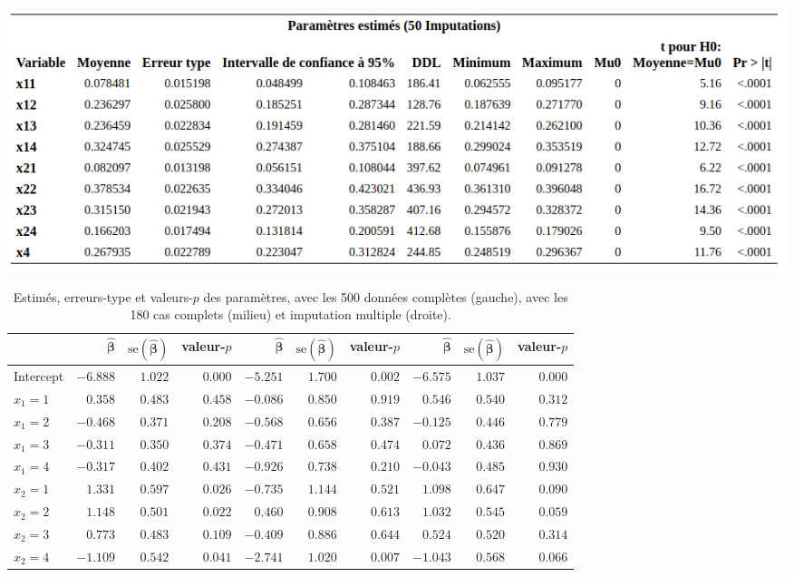 \documentclass[
  11pt,
  letterpaper,
]{book}
\theoremstyle{definition}
\theoremstyle{definition}
\theoremstyle{definition}
\theoremstyle{definition}
\theoremstyle{remark}
\begin{document}
\begin{center}\includegraphics[width=1\linewidth]{figures/06-manquantes-e5} \end{center}

\begin{table}

\caption{\label{tab:missing3r}Estimés, erreurs-type et valeurs-$p$ des paramètres,  avec les 500 données complètes (gauche), avec les 180 cas complets (milieu) et imputation multiple (droite).}
\centering
\begin{tabular}[t]{lrrrrrrrrr}
\toprule
  & $\widehat{\boldsymbol{\beta}}$ & $\mathrm{se}(\widehat{\boldsymbol{\beta}})$ & valeur-$p$ & $\widehat{\boldsymbol{\beta}}$ & $\mathrm{se}(\widehat{\boldsymbol{\beta}})$ & valeur-$p$ & $\widehat{\boldsymbol{\beta}}$ & $\mathrm{se}(\widehat{\boldsymbol{\beta}})$ & valeur-$p$\\
\midrule
Intercept & $-6.888$ & $1.022$ & $0.000$ & $-5.251$ & $1.700$ & $0.002$ & $-6.575$ & $1.037$ & $0.000$\\
$x_1=1$ & $0.358$ & $0.483$ & $0.458$ & $-0.086$ & $0.850$ & $0.919$ & $0.546$ & $0.540$ & $0.312$\\
$x_1=2$ & $-0.468$ & $0.371$ & $0.208$ & $-0.568$ & $0.656$ & $0.387$ & $-0.125$ & $0.446$ & $0.779$\\
$x_1=3$ & $-0.311$ & $0.350$ & $0.374$ & $-0.471$ & $0.658$ & $0.474$ & $0.072$ & $0.436$ & $0.869$\\
$x_1=4$ & $-0.317$ & $0.402$ & $0.431$ & $-0.926$ & $0.738$ & $0.210$ & $-0.043$ & $0.485$ & $0.930$\\
\addlinespace
$x_2=1$ & $1.331$ & $0.597$ & $0.026$ & $-0.735$ & $1.144$ & $0.521$ & $1.098$ & $0.647$ & $0.090$\\
$x_2=2$ & $1.148$ & $0.501$ & $0.022$ & $0.460$ & $0.908$ & $0.613$ & $1.032$ & $0.545$ & $0.059$\\
$x_2=3$ & $0.773$ & $0.483$ & $0.109$ & $-0.409$ & $0.886$ & $0.644$ & $0.524$ & $0.520$ & $0.314$\\
$x_2=4$ & $-1.109$ & $0.542$ & $0.041$ & $-2.741$ & $1.020$ & $0.007$ & $-1.043$ & $0.568$ & $0.066$\\

\end{tabular}
\end{table}
\end{document}
